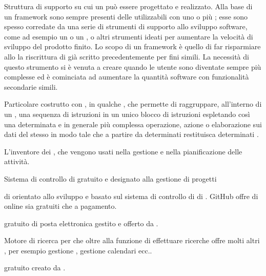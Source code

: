 {Struttura di supporto su cui un  può essere progettato e realizzato. Alla base di un framework sono sempre presenti delle  utilizzabili con uno o più ; esse sono spesso corredate da una serie di strumenti di supporto allo sviluppo software, come ad esempio un  o un , o altri strumenti ideati per aumentare la velocità di sviluppo del prodotto finito.
Lo scopo di un framework è quello di far risparmiare allo  la riscrittura di  già scritto precedentemente per fini simili. La necessità di questo strumento si è venuta a creare quando le  utente sono diventate sempre più complesse ed è cominciata ad aumentare la quantità software con funzionalità secondarie simili.}


{Particolare costrutto con , in qualche , che permette di raggruppare, all'interno di un , una sequenza di istruzioni in un unico blocco di istruzioni espletando così una determinata e in generale più complessa operazione, azione o elaborazione sui dati del  stesso in modo tale che a partire da determinati  restituisca determinati .}



{L'inventore dei , che vengono usati nella gestione e nella pianificazione delle attività.}


{Sistema di controllo di   gratuito e  designato alla gestione di progetti }


{ di   orientato allo sviluppo  e basato sul sistema di controllo di  di . GitHub offre  di  online sia gratuiti che a pagamento.}


{ gratuito di posta elettronica gestito e offerto da .}

{Motore di ricerca per  che oltre alla funzione di effettuare ricerche offre molti altri , per esempio gestione , gestione calendari ecc..} 


{  gratuito creato da .}


